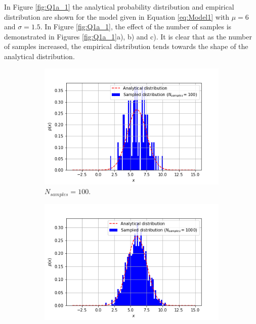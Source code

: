 \documentclass{article}
\begin{document}
In Figure \ref{fig:Q1a_1} the analytical probability distribution and empirical distribution are shown for the model given in Equation \eqref{eq:Model1} with $\mu=6$ and $\sigma=1.5$. In Figure \ref{fig:Q1a_1}, the effect of the number of samples is demonstrated in Figures \ref{fig:Q1a_1}a), b) and c). It is clear that as the number of samples increased, the empirical distribution tends towards the shape of the analytical distribution. 
\begin{figure}[!htb]
     \centering
     \begin{subfigure}[b]{0.3\textwidth}
         \centering
         \includegraphics[width=\textwidth]{Q1a_fig1.png}
         \caption{$N_{samples} = 100$.}
     \end{subfigure}
     \hfill
     \begin{subfigure}[b]{0.3\textwidth}
         \centering
         \includegraphics[width=\textwidth]{Q1a_fig2.png}

\end{subfigure}
\end{figure}
\end{document}
